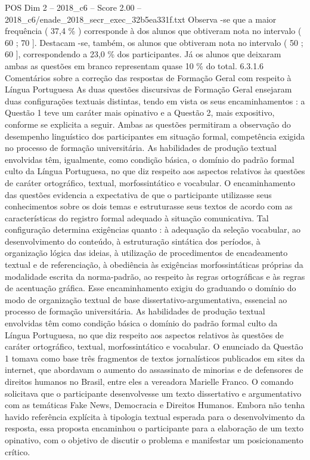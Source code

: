 \begin{textsample}{POS Dim 2 – 2018\_c6 – Score 2.00 – 2018\_c6/enade\_2018\_secr\_exec\_32b5ea331f.txt}
Observa -se que a maior frequência ( 37,4 \% ) corresponde à dos alunos que obtiveram nota no intervalo ( 60 ; 70 ].
Destacam -se, também, os alunos que obtiveram nota no intervalo ( 50 ; 60 ], correspondendo a 23,0 \% dos participantes.
Já os alunos que deixaram ambas as questões em branco representam quase 10 \% do total. 6.3.1.6 Comentários sobre a correção das respostas de Formação Geral com respeito à Língua Portuguesa As duas questões discursivas de Formação Geral ensejaram duas configurações textuais distintas, tendo em vista os seus encaminhamentos : a Questão 1 teve um caráter mais opinativo e a Questão 2, mais expositivo, conforme se explicita a seguir.
Ambas as questões permitiram a observação do desempenho linguístico dos participantes em situação formal, competência exigida no processo de formação universitária.
As habilidades de produção textual envolvidas têm, igualmente, como condição básica, o domínio do padrão formal culto da Língua Portuguesa, no que diz respeito aos aspectos relativos às questões de caráter ortográfico, textual, morfossintático e vocabular.
O encaminhamento das questões evidencia a expectativa de que o participante utilizasse seus conhecimentos sobre os dois temas e estruturasse seus textos de acordo com as características do registro formal adequado à situação comunicativa.
Tal configuração determina exigências quanto : à adequação da seleção vocabular, ao desenvolvimento do conteúdo, à estruturação sintática dos períodos, à organização lógica das ideias, à utilização de procedimentos de encadeamento textual e de referenciação, à obediência às exigências morfossintáticas próprias da modalidade escrita da norma-padrão, ao respeito às regras ortográficas e às regras de acentuação gráfica.
Esse encaminhamento exigiu do graduando o domínio do modo de organização textual de base dissertativo-argumentativa, essencial ao processo de formação universitária.
As habilidades de produção textual envolvidas têm como condição básica o domínio do padrão formal culto da Língua Portuguesa, no que diz respeito aos aspectos relativos às questões de caráter ortográfico, textual, morfossintático e vocabular.
O enunciado da Questão 1 tomava como base três fragmentos de textos jornalísticos publicados em sites da internet, que abordavam o aumento do assassinato de minorias e de defensores de direitos humanos no Brasil, entre eles a vereadora Marielle Franco.
O comando solicitava que o participante desenvolvesse um texto dissertativo e argumentativo com as temáticas Fake News, Democracia e Direitos Humanos.
Embora não tenha havido referência explícita à tipologia textual esperada para o desenvolvimento da resposta, essa proposta encaminhou o participante para a elaboração de um texto opinativo, com o objetivo de discutir o problema e manifestar um posicionamento crítico.

\end{textsample}
